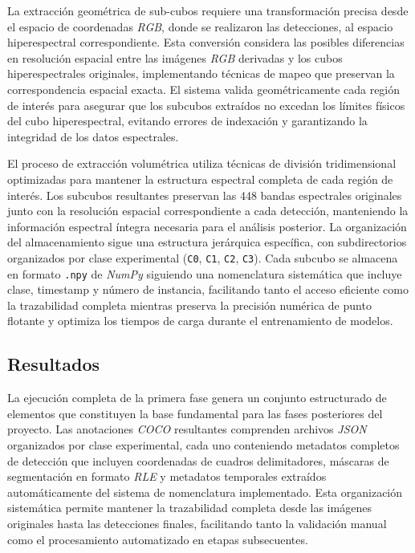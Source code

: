 \vspace{5mm}

La extracción geométrica de sub-cubos requiere una transformación precisa desde el espacio de coordenadas \emph{RGB}, donde se realizaron las detecciones, al espacio hiperespectral correspondiente. Esta conversión considera las posibles diferencias en resolución espacial entre las imágenes \emph{RGB} derivadas y los cubos hiperespectrales originales, implementando técnicas de mapeo que preservan la correspondencia espacial exacta. El sistema valida geométricamente cada región de interés para asegurar que los subcubos extraídos no excedan los límites físicos del cubo hiperespectral, evitando errores de indexación y garantizando la integridad de los datos espectrales.

\vspace{5mm}

El proceso de extracción volumétrica utiliza técnicas de división tridimensional optimizadas para mantener la estructura espectral completa de cada región de interés. Los subcubos resultantes preservan las 448 bandas espectrales originales junto con la resolución espacial correspondiente a cada detección, manteniendo la información espectral íntegra necesaria para el análisis posterior. La organización del almacenamiento sigue una estructura jerárquica específica, con subdirectorios organizados por clase experimental (\texttt{C0}, \texttt{C1}, \texttt{C2}, \texttt{C3}). Cada subcubo se almacena en formato \texttt{.npy} de \emph{NumPy} siguiendo una nomenclatura sistemática que incluye clase, timestamp y número de instancia, facilitando tanto el acceso eficiente como la trazabilidad completa mientras preserva la precisión numérica de punto flotante y optimiza los tiempos de carga durante el entrenamiento de modelos.

\subsection{Resultados}

La ejecución completa de la primera fase genera un conjunto estructurado de elementos que constituyen la base fundamental para las fases posteriores del proyecto. Las anotaciones \emph{COCO} resultantes comprenden archivos \emph{JSON} organizados por clase experimental, cada uno conteniendo metadatos completos de detección que incluyen coordenadas de cuadros delimitadores, máscaras de segmentación en formato \emph{RLE} y metadatos temporales extraídos automáticamente del sistema de nomenclatura implementado. Esta organización sistemática permite mantener la trazabilidad completa desde las imágenes originales hasta las detecciones finales, facilitando tanto la validación manual como el procesamiento automatizado en etapas subsecuentes.

